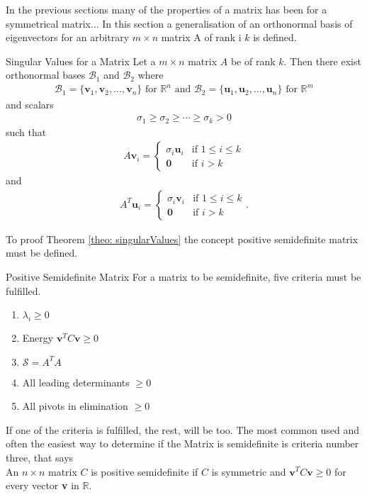 In the previous sections many of the properties of a matrix has been for a symmetrical matrix...
In this section a generalisation of an orthonormal basis of eigenvectors for an arbitrary $m \times n$ matrix A of rank i $k$ is defined. 
\begin{theorem}{Singular Values for a Matrix}
Let a $m \times n$ matrix $A$ be of rank $k$. Then there exist orthonormal bases $\mathcal{B}_1$ and $\mathcal{B}_2$ where
\begin{align*}
    \mathcal{B}_1=\{\mathbf{v}_1,\mathbf{v}_2,...,\mathbf{v}_n\} \text{ for } \mathbb{R}^n \text{  and  } \mathcal{B}_2=\{\mathbf{u}_1,\mathbf{u}_2,...,\mathbf{u}_n\} \text{ for } \mathbb{R}^m
\end{align*}
and scalars
\begin{align*}
    \sigma_1 \geq \sigma_2 \geq \cdots \geq \sigma_k > 0 
\end{align*}
such that
\begin{align}
    A\mathbf{v}_i=
    \begin{cases}
          \sigma_i\mathbf{u}_i & \text{if } 1\leq i\leq k\\
          \mathbf{0} & \text{if } i>k
    \end{cases}
\label{eq: eq3FromDefSingularValues}
\end{align}
and
\begin{align*}
    A^T\mathbf{u}_i=
    \begin{cases}
          \sigma_i\mathbf{v}_i & \text{if } 1\leq i\leq k\\
          \mathbf{0} & \text{if } i>k
    \end{cases}.
\end{align*}
\cite[439]{LiAl}
\label{theo: singularValues}
\end{theorem}
To proof Theorem \ref{theo: singularValues} the concept positive semidefinite matrix must be defined.
\begin{definition}{Positive Semidefinite Matrix}
    For a matrix to be semidefinite, five criteria must be fulfilled. 
    \begin{enumerate}
        \item $\lambda_i \geq 0$
        \item Energy $\mathbf{v}^T C \mathbf{v} \geq 0$
        \item $\mathcal{S}=A^TA$
        \item All leading determinants $\geq 0$ 
        \item All pivots in elimination $\geq 0$
    \end{enumerate}
    If one of the criteria is fulfilled, the rest, will be too.
    The most common used and often the 
    easiest way to determine if the Matrix is semidefinite is criteria number three, that says\\
    An $n\times n$ matrix $C$ is positive semidefinite if $C$ is symmetric and $\mathbf{v}^T C \mathbf{v} \geq 0$ for every vector \textbf{v} in $\mathbb{R}$. 
    \label{def: PSD}
\cite[436]{LiAl}
\end{definition}
